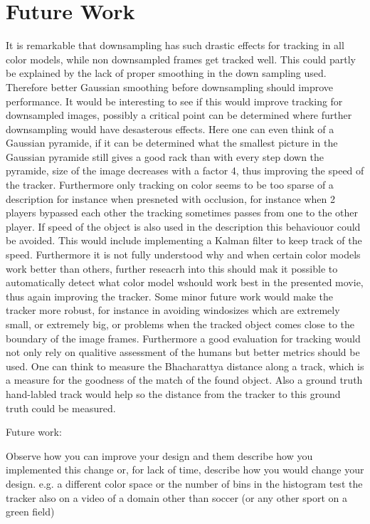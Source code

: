 \documentclass[a4paper,11pt]{article}
\begin{document}
\section{Future Work} \label{sec:fut}
It is remarkable that downsampling has such drastic effects for tracking in all color models, while non downsampled frames get tracked well. This could partly be explained by the lack of proper smoothing in the down sampling used. Therefore better Gaussian smoothing before downsampling should improve performance. It would be interesting to see if this would improve tracking for downsampled images, possibly a critical point can be determined where further downsampling would have desasterous effects.
Here one can even think of a Gaussian pyramide, if it can be determined what the smallest picture in the Gaussian pyramide still gives a good rack than with every step down the pyramide, size of the image decreases with a factor 4, thus improving the speed of the tracker. 
Furthermore only tracking on color seems to be too sparse of a description for instance when presneted with occlusion, for instance when 2 players bypassed each other the tracking sometimes passes from one to the other player. If speed of the object is also used in the description this behaviouor could be avoided. This would include implementing a Kalman filter to keep track of the speed. 
Furthermore it is not fully understood why and when certain color models work better than others, further reseacrh into this should mak it possible to automatically detect what color model wshould work best in the presented movie, thus again improving the tracker.
Some minor future work would make the tracker more robust, for instance in avoiding windosizes which are extremely small, or extremely big, or problems when the tracked object comes close to the boundary of the image frames. 
Furthermore a good evaluation for tracking would not only rely on qualitive assessment of the humans but better metrics should be used. One can think to measure the Bhacharattya distance along a track, which is a measure for the goodness of the match of the found object. Also a ground truth hand-labled track would help so the distance from the tracker to this ground truth could be measured.


Future work:


Observe how you can improve your design and them describe how you implemented this change or, for lack of time, describe how you would change your design. 
e.g. a different color space or the number of bins in the histogram
test the tracker also on a video of a domain other than soccer (or any other sport on a green field)
\end{document}
